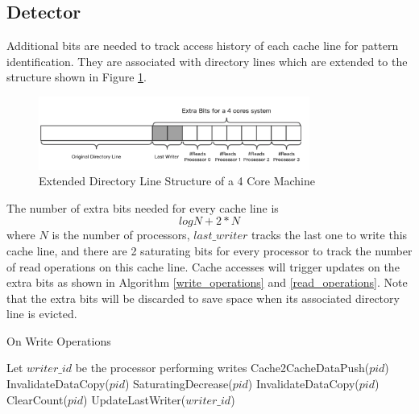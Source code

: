 \documentclass[conference]{IEEEtran}
\begin{document}
\subsection{Detector}

Additional bits are needed to track access history of each cache line for pattern identification. They are associated with directory lines which are extended to the structure shown in Figure \ref{dir_line}.

\begin{figure}[!h]
\centering
\captionsetup{justification=centering}
\includegraphics[width=3.5in]{dir_line.png}
\caption{Extended Directory Line Structure of a 4 Core Machine}
\label{dir_line}
\end{figure}
\FloatBarrier

The number of extra bits needed for every cache line is
\begin{equation*}
log N + 2 * N
\end{equation*}
where $N$ is the number of processors, $last\_writer$ tracks the last one to write this cache line, and there are 2 saturating bits for every processor to track the number of read operations on this cache line. Cache accesses will trigger updates on the extra bits as shown in Algorithm \ref{write_operations} and \ref{read_operations}. Note that the extra bits will be discarded to save space when its associated directory line is evicted.

\begin{algorithm}
\caption{On Write Operations}
\label{write_operations}
\begin{algorithmic}[1]
\State Let $writer\_id$ be the processor performing writes
     
            \State Cache2CacheDataPush($pid$) 
        \Else
            \State InvalidateDataCopy($pid$) 
        \EndIf
    \EndFor
\Else
    \State SaturatingDecrease($pid$) 
     
        \State InvalidateDataCopy($pid$) 
        \State ClearCount($pid$) 
    \EndFor
    \State UpdateLastWriter($writer\_id$)
\EndIf
\end{algorithmic}
\end{algorithm}
\end{document}
